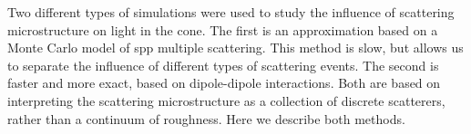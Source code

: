Two different types of simulations were used to study the influence of
scattering microstructure on light in the cone.  The first is an approximation
based on a Monte Carlo model of \gls{spp} multiple scattering.  This method is
slow, but allows us to separate the influence of different types of scattering
events.  The second is faster and more exact, based on dipole-dipole
interactions.  Both are based on interpreting the scattering microstructure as
a collection of discrete scatterers, rather than a continuum of roughness.
Here we describe both methods.
